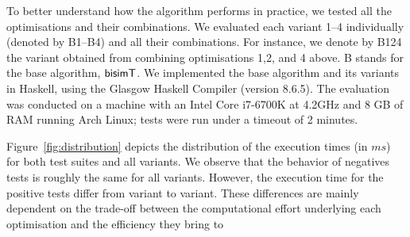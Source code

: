 To better understand how the algorithm performs in practice, we tested
all the optimisations and their combinations. We evaluated each variant 
1--4 individually (denoted
by B1--B4) and all their combinations. For instance, we denote by B124
the variant obtained from combining optimisations 1,2, and 4 above.
B stands for the base algorithm, $\mathsf{bisimT}$.
%
  We implemented the base algorithm and its
  variants %
  in Haskell, using the Glasgow Haskell Compiler (version 8.6.5). %
  The evaluation was conducted on a machine with an Intel Core i7-6700K at
  4.2GHz and 8 GB of RAM running Arch Linux; tests were run under a timeout
  of 2 minutes.

%
%
%
Figure~\ref{fig:distribution} depicts the distribution of the execution
times (in $ms$) for both test suites and all variants. We observe that 
the behavior of negatives tests is roughly the same for all variants. However,
the execution time for the positive tests differ from variant to variant. These
differences are mainly dependent on the trade-off between the computational
effort underlying each optimisation and the efficiency they bring to

